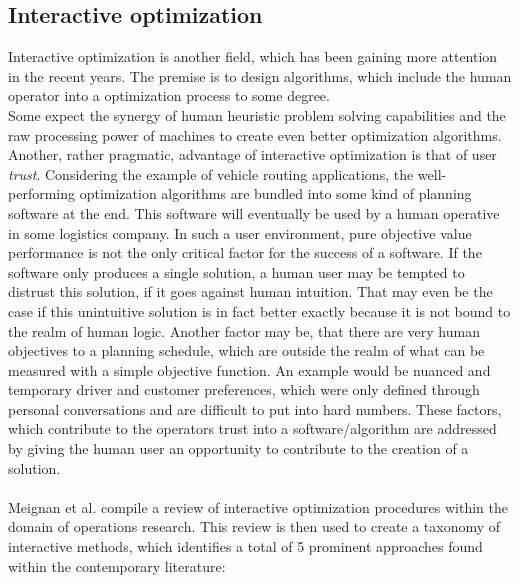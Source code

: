 \subsection{Interactive optimization}\label{sec:interactive}

Interactive optimization is another field, which has been gaining more attention in the recent years. The premise is to design algorithms, which include the human operator into a optimization process to some degree.\\
Some expect the synergy of human heuristic problem solving capabilities and the raw processing power of machines to create even better optimization algorithms. Another, rather pragmatic, advantage of interactive optimization is that of user \textit{trust}. Considering the example of vehicle routing applications, the well-performing optimization algorithms are bundled into some kind of planning software at the end. This software will eventually be used by a human operative in some logistics company. In such a user environment, pure objective value performance is not the only critical factor for the success of a software. If the software only produces a single solution, a human user may be tempted to distrust this solution, if it goes against human intuition. That may even be the case if this unintuitive solution is in fact better exactly because it is not bound to the realm of human logic. Another factor may be, that  there are very human objectives to a planning schedule, which are outside the realm of what can be measured with a simple objective function. An example would be nuanced and temporary driver and customer preferences, which were only defined through personal conversations and are difficult to put into hard numbers. These factors, which contribute to the operators trust into a software/algorithm are addressed by giving the human user an opportunity to contribute to the creation of a solution.\cite{urquhart_increasing_2019} \\ \\
Meignan et al. \cite{meignan_review_2015} compile a review of interactive optimization procedures within the domain of operations research. This review is then used to create a taxonomy of interactive methods, which identifies a total of 5 prominent approaches found within the contemporary literature:
